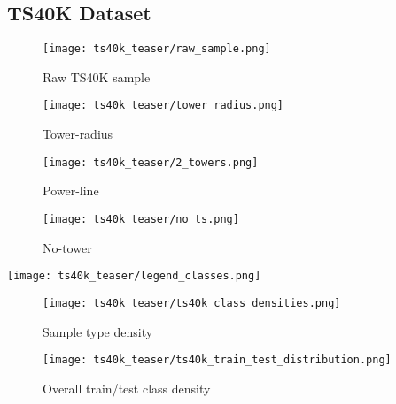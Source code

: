 \subsection{TS40K Dataset}
\begin{figure*}[t]
\centering
\begin{minipage}[t]{0.48\textwidth} %
    \begin{subfigure}[b]{\textwidth}
        \texttt{[image: ts40k\_teaser/raw\_sample.png]}
        \caption{Raw TS40K sample}
        \label{fig:teaser-raw-sample}
    \end{subfigure}
    \vfill
    \begin{subfigure}[b]{0.33\textwidth}
        \texttt{[image: ts40k\_teaser/tower\_radius.png]}
        \caption{Tower-radius}
        \label{fig:teaser-tower-radius}
    \end{subfigure}
    \hfill
    \begin{subfigure}[b]{0.33\textwidth}
        \texttt{[image: ts40k\_teaser/2\_towers.png]}
        \caption{Power-line}
        \label{fig:teaser-power-line}
    \end{subfigure}
    \hfill
    \begin{subfigure}[b]{0.30\textwidth}
        \texttt{[image: ts40k\_teaser/no\_ts.png]}
        \caption{No-tower}
        \label{fig:teaser-no-ts}
    \end{subfigure}
    \vfill
    \texttt{[image: ts40k\_teaser/legend\_classes.png]}
\end{minipage}
\quad
\begin{minipage}[t]{0.48\textwidth} %
    \begin{subfigure}[b]{1.0\textwidth}
        \texttt{[image: ts40k\_teaser/ts40k\_class\_densities.png]}
        \caption{Sample type density}
        \label{fig:density1}
    \end{subfigure}
    \hfill
    \begin{subfigure}[b]{1.0\textwidth}
        \texttt{[image: ts40k\_teaser/ts40k\_train\_test\_distribution.png]}
        \caption{Overall train/test class density}
        \label{fig:density2}
    \end{subfigure}
\end{minipage}


\end{figure*}
